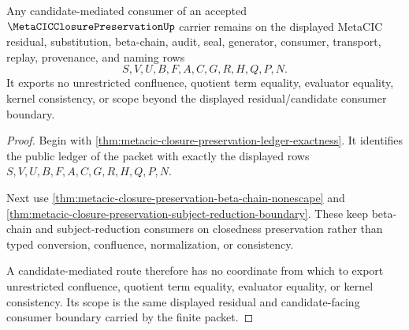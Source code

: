 \begin{theorem}
\label{thm:metacic-closure-preservation-candidate-mediated-scope}
Any candidate-mediated consumer of an accepted $\MetaCICClosurePreservationUp$ carrier remains on the displayed MetaCIC residual, substitution, beta-chain, audit, seal, generator, consumer, transport, replay, provenance, and naming rows
$$
S,V,U,B,F,A,C,G,R,H,Q,P,N.
$$
It exports no unrestricted confluence, quotient term equality, evaluator equality, kernel consistency, or scope beyond the displayed residual/candidate consumer boundary.
\end{theorem}
\begin{proof}
Begin with \autoref{thm:metacic-closure-preservation-ledger-exactness}. It identifies the public ledger of the packet with exactly the displayed rows $S,V,U,B,F,A,C,G,R,H,Q,P,N$.

Next use \autoref{thm:metacic-closure-preservation-beta-chain-nonescape} and \autoref{thm:metacic-closure-preservation-subject-reduction-boundary}. These keep beta-chain and subject-reduction consumers on closedness preservation rather than typed conversion, confluence, normalization, or consistency.

A candidate-mediated route therefore has no coordinate from which to export unrestricted confluence, quotient term equality, evaluator equality, or kernel consistency. Its scope is the same displayed residual and candidate-facing consumer boundary carried by the finite packet.
\end{proof}

